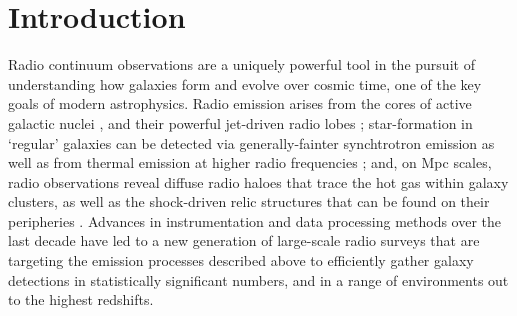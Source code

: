 \documentclass[usenatbib,usedcolumn]{mnras}
\begin{document}

\section{Introduction}

Radio continuum observations are a uniquely powerful tool in the pursuit of understanding how galaxies form and evolve over cosmic time, one of the key goals of modern astrophysics. Radio emission arises from the cores of active galactic nuclei \citep[AGN;][]{white2015,whittam2016}, and their powerful jet-driven radio lobes \citep{laing2011,fanaroff2021}; star-formation in `regular' galaxies can be detected via generally-fainter synchtrotron emission \citep{condon1992,jarvis2010,delvecchio2021} as well as from thermal emission at higher radio frequencies \citep{murphy2017}; and, on Mpc scales, radio observations reveal diffuse radio haloes that trace the hot gas within galaxy clusters, as well as the shock-driven relic structures that can be found on their peripheries \citep{vanweeren2019}. Advances in instrumentation and data processing methods over the last decade have led to a new generation of large-scale radio surveys that are targeting the emission processes described above to efficiently gather galaxy detections in statistically significant numbers, and in a range of environments out to the highest redshifts.
\end{document}
